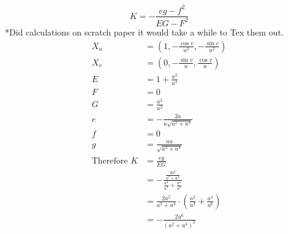\documentclass[a4paper,17pt]{extarticle}
\theoremstyle{definition}
\begin{document}
\begin{enumerate}
$$K=-\frac{eg-f^2}{EG-F^2}$$
*Did calculations on scratch paper it would take a while to Tex them out.
\begin{align*}
    X_u&=\left(1,-\frac{\cos v}{u^2},-\frac{\sin v}{u^2}\right)\\
    X_v&=\left(0,-\frac{\sin v}{u},\frac{\cos v}{u}\right)\\
    E&=1+\frac{a^2}{u^4}\\
    F&=0\\
    G&=\frac{a^2}{u^2}\\
    e&=-\frac{2a}{u\sqrt{a^2+u^4}}\\
    f&=0\\
    g&=\frac{au}{\sqrt{a^2+u^4}}\\
    \text{Therefore }K&=\frac{eg}{EG}\\
    &=-\frac{\frac{2a^2}{a^2+u^4}}{\frac{a^2}{u^2}+\frac{a^4}{u^6}}\\
    &=\frac{2a^2}{a^2+u^4}\cdot(\frac{a^2}{u^2}+\frac{a^4}{u^6})\\
    &=-\frac{2u^6}{(a^2+u^4)^2}
\end{align*}
\end{enumerate}
\end{document}

